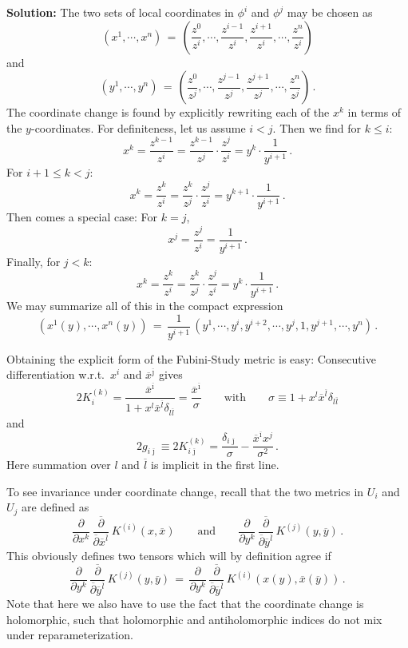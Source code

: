 \documentclass[12pt]{article}
\newcommand{\be}{\begin{equation}}
\newcommand{\ee}{\end{equation}}
\newcommand{\ol}{\overline}
\numberwithin{equation}{section}
\begin{document}
\noindent
{\bf Solution:} The two sets of local coordinates in $\phi^i$ and $\phi^j$ may be chosen as
\be
(x^1,\cdots,x^n)\,=\,\left(\frac{z^0}{z^i},\cdots,\frac{z^{i-1}}{z^i},
\frac{z^{i+1}}{z^i},\cdots,\frac{z^n}{z^i} \right)
\ee
and
\be
(y^1,\cdots,y^n)\,=\,\left(\frac{z^0}{z^j},\cdots,\frac{z^{j-1}}{z^j},
\frac{z^{j+1}}{z^j},\cdots,\frac{z^n}{z^j} \right)\,.
\ee
The coordinate change is found by explicitly rewriting each of the $x^k$ in terms of the $y$-coordinates. For definiteness, let us assume $i<j$. Then we find for $k\leq i$:
\be
x^k=\frac{z^{k-1}}{z^i}=\frac{z^{k-1}}{z^j}\cdot\frac{z^j}{z^i}=y^k\cdot\frac{1}{y^{i+1}}\,.
\ee
For $i+1\leq k < j$:
\be
x^k=\frac{z^k}{z^i}=\frac{z^k}{z^j}\cdot\frac{z^j}{z^i}=y^{k+1}\cdot\frac{1}{y^{i+1}}\,.
\ee
Then comes a special case: For $k=j$,
\be
x^j=\frac{z^j}{z^i}=\frac{1}{y^{i+1}}\,.
\ee
Finally, for $j<k$:
\be
x^k=\frac{z^k}{z^i}=\frac{z^k}{z^j}\cdot\frac{z^j}{z^i}=y^k\cdot\frac{1}{y^{i+1}}\,.
\ee
We may summarize all of this in the compact expression
\be
(x^1(y),\cdots,x^n(y))\,=\,\frac{1}{y^{i+1}}\,(y^1,\cdots,y^i,y^{i+2},\cdots,
y^j,1,y^{j+1},\cdots,y^n)\,.
\ee

Obtaining the explicit form of the Fubini-Study metric is easy: Consecutive differentiation w.r.t.~$x^i$ and $\ol{x}^{\ol{\jmath}}$ gives
\be
2K^{(k)}_i=\frac{\ol{x}^{\ol{\imath}}}{1+x^l \ol{x}^{\ol{l}}\delta_{l\ol{l}}}
= \frac{\ol{x}^{\ol{\imath}}}{\sigma}\qquad \mbox{with}\qquad \sigma\equiv 1+x^l \ol{x}^{\ol{l}}\delta_{l\ol{l}} 
\ee
and
\be
2g_{i\ol{\jmath}}\equiv 2K^{(k)}_{i\ol{\jmath}} = \frac{\delta_{i\ol{\jmath}}}{\sigma} - \frac{\ol{x}^{\ol{\imath}}x^j}{\sigma^2}\,.
\ee
Here summation over $l$ and $\ol{l}$ is implicit in the first line.

To see invariance under coordinate change, recall that the two metrics in $U_i$ and $U_j$ are defined as
\be
\frac{\partial}{\partial x^k}\, \frac{\ol{\partial}}{\ol{\partial}\ol{x}^{\ol{l}}} \,K^{(i)}(x,\ol{x})
 \qquad\mbox{and}\qquad \frac{\partial}{\partial y^k}\, \frac{\ol{\partial}}{\ol{\partial}\ol{y}^{\ol{l}}} \,K^{(j)}(y,\ol{y})\,.
\ee
This obviously defines two tensors which will by definition agree if 
\be
\frac{\partial}{\partial y^k}\, \frac{\ol{\partial}}{\ol{\partial}\ol{y}^{\ol{l}}} \,K^{(j)}(y,\ol{y})\,=\,
\frac{\partial}{\partial y^k}\, \frac{\ol{\partial}}{\ol{\partial}\ol{y}^{\ol{l}}}\, K^{(i)}(x(y),\ol{x}(\ol{y}))\,.\label{kij}
\ee
Note that here we also have to use the fact that the coordinate change is holomorphic, such that holomorphic and antiholomorphic indices do not mix under reparameterization.
\end{document}
